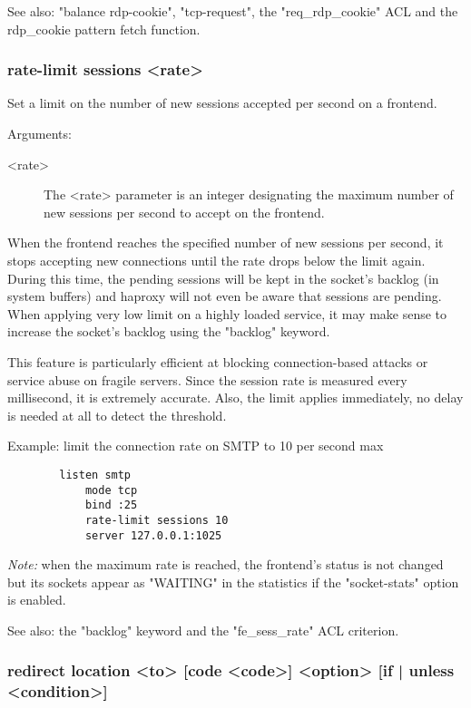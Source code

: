   See also: "balance rdp-cookie", "tcp-request", the "req\_rdp\_cookie" ACL and
  the rdp\_cookie pattern fetch function.

\subsubsection[rate-limit sessions]{rate-limit sessions <rate>}


  Set a limit on the number of new sessions accepted per second on a frontend.


  Arguments:
  \begin{description}
  \item[<rate>] The <rate> parameter is an integer designating the maximum number
              of new sessions per second to accept on the frontend.
  \end{description}
  
  When the frontend reaches the specified number of new sessions per second, it
  stops accepting new connections until the rate drops below the limit again.
  During this time, the pending sessions will be kept in the socket's backlog
  (in system buffers) and haproxy will not even be aware that sessions are
  pending. When applying very low limit on a highly loaded service, it may make
  sense to increase the socket's backlog using the "backlog" keyword.

  This feature is particularly efficient at blocking connection-based attacks
  or service abuse on fragile servers. Since the session rate is measured every
  millisecond, it is extremely accurate. Also, the limit applies immediately,
  no delay is needed at all to detect the threshold.

  Example: limit the connection rate on SMTP to 10 per second max
  \begin{verbatim} 
        listen smtp
            mode tcp
            bind :25
            rate-limit sessions 10
            server 127.0.0.1:1025
  \end{verbatim}

  \emph{Note:} when the maximum rate is reached, the frontend's status is not changed
         but its sockets appear as "WAITING" in the statistics if the
         "socket-stats" option is enabled.

  See also: the "backlog" keyword and the "fe\_sess\_rate" ACL criterion.


\subsubsection[redirect location] {redirect location <to> [code <code>] <option> [{if | unless} <condition>]}
